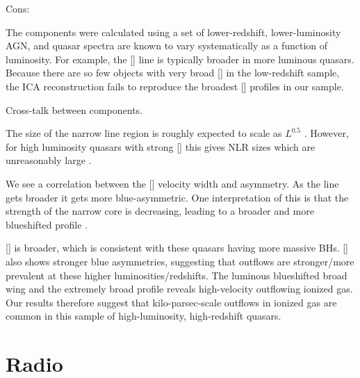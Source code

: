 Cons:

The components were calculated using a set of lower-redshift, lower-luminosity AGN, and quasar spectra are known to vary systematically as a function of luminosity. 
For example, the [] line is typically broader in more luminous quasars. 
Because there are so few objects with very broad [] in the low-redshift sample, the ICA reconstruction fails to reproduce the broadest [] profiles in our sample. 

Cross-talk between components. 






The size of the narrow line region is roughly expected to scale as $L^{0.5}$ \citep[e.g.][]{netzer04}. 
However, for high luminosity quasars with strong [] this gives NLR sizes which are unreasonably large \citep[$\sim100$ kilo-parsec;][]{netzer04}. 




We see a correlation between the [] velocity width and asymmetry. 
As the line gets broader it gets more blue-asymmetric. 
One interpretation of this is that the strength of the narrow core is decreasing, leading to a broader and more blueshifted profile \citep[e.g.][]{shen14}. 


[] is broader, which is consistent with these quasars having more massive BHs. 
[] also shows stronger blue asymmetries, suggesting that outflows are stronger/more prevalent at these higher luminosities/redshifts. 
The luminous blueshifted broad wing and the extremely broad profile reveals high-velocity outflowing ionized gas. 
Our results therefore suggest that kilo-parsec-scale outflows in ionized gas are common in this sample of high-luminosity, high-redshift quasars.



\section{Radio}

